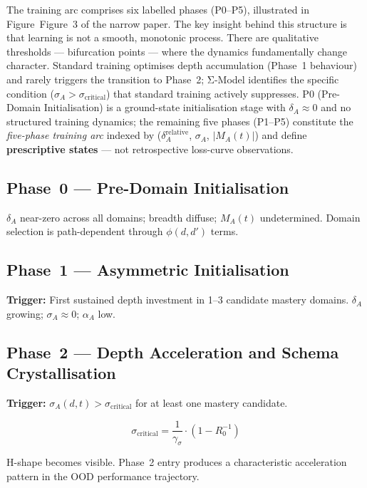 \documentclass[11pt]{article}
\theoremstyle{definition}
\theoremstyle{plain}
\begin{document}
The training arc comprises six labelled phases (P0--P5), illustrated in Figure~Figure~3 of the narrow paper. The key insight behind this structure is that learning is not a smooth, monotonic process. There are qualitative thresholds --- bifurcation points --- where the dynamics fundamentally change character. Standard training optimises depth accumulation (Phase~1 behaviour) and rarely triggers the transition to Phase~2; Σ-Model identifies the specific condition ($\sigma_A > \sigma_{\text{critical}}$) that standard training actively suppresses. P0
(Pre-Domain Initialisation) is a ground-state initialisation stage
with $\delta_A \approx 0$ and no structured training dynamics; the
remaining five phases (P1--P5) constitute the \emph{five-phase
training arc} indexed by
($\delta_A^{\text{relative}}$, $\sigma_A$, $|M_A(t)|$) and define
\textbf{prescriptive states} --- not retrospective loss-curve
observations.

\subsection*{Phase~0 --- Pre-Domain Initialisation}

$\delta_A$ near-zero across all domains; breadth diffuse; $M_A(t)$
undetermined. Domain selection is path-dependent through $\phi(d,d')$
terms.

\subsection*{Phase~1 --- Asymmetric Initialisation}

\textbf{Trigger:} First sustained depth investment in 1--3 candidate
mastery domains. $\delta_A$ growing; $\sigma_A \approx 0$; $\alpha_A$
low.

\subsection*{Phase~2 --- Depth Acceleration and Schema Crystallisation}

\textbf{Trigger:} $\sigma_A(d,t) > \sigma_{\text{critical}}$ for at
least one mastery candidate.

\begin{equation}\label{eq:sigma-critical}
\sigma_{\text{critical}} = \frac{1}{\gamma_\sigma} \cdot (1 - R_0^{-1})
\end{equation}

H-shape becomes visible. Phase~2 entry produces a characteristic
acceleration pattern in the OOD performance trajectory.
\end{document}
